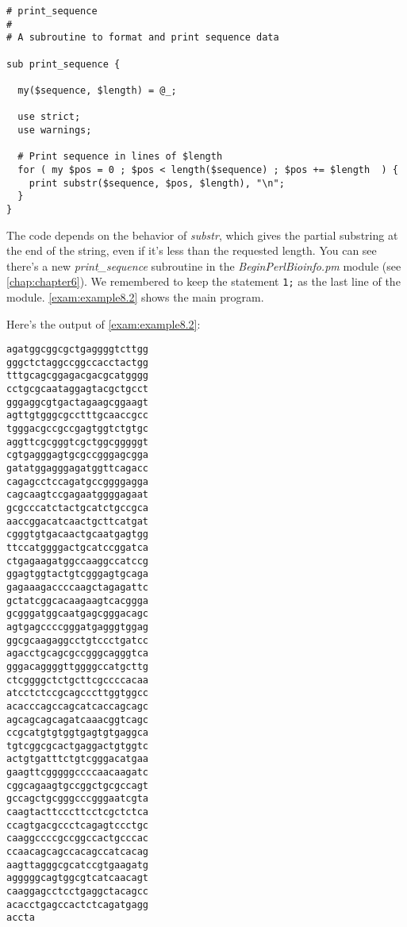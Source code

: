 \begin{lstlisting}
# print_sequence
#
# A subroutine to format and print sequence data 

sub print_sequence {
  
  my($sequence, $length) = @_;

  use strict;
  use warnings;

  # Print sequence in lines of $length
  for ( my $pos = 0 ; $pos < length($sequence) ; $pos += $length  ) {
    print substr($sequence, $pos, $length), "\n";
  }
}
\end{lstlisting}

The code depends on the behavior of \textit{substr}, which gives the partial substring at the end of the string, even if it's less than the requested length. You can see there's a new \textit{print\_sequence} subroutine in the \textit{BeginPerlBioinfo.pm} module (see \autoref{chap:chapter6}). We remembered to keep the statement \verb|1;| as the last line of the module. \autoref{exam:example8.2} shows the main program. 



Here's the output of \autoref{exam:example8.2}:

\begin{lstlisting}
agatggcggcgctgaggggtcttgg
gggctctaggccggccacctactgg
tttgcagcggagacgacgcatgggg
cctgcgcaataggagtacgctgcct
gggaggcgtgactagaagcggaagt
agttgtgggcgcctttgcaaccgcc
tgggacgccgccgagtggtctgtgc
aggttcgcgggtcgctggcgggggt
cgtgagggagtgcgccgggagcgga
gatatggagggagatggttcagacc
cagagcctccagatgccggggagga
cagcaagtccgagaatggggagaat
gcgcccatctactgcatctgccgca
aaccggacatcaactgcttcatgat
cgggtgtgacaactgcaatgagtgg
ttccatggggactgcatccggatca
ctgagaagatggccaaggccatccg
ggagtggtactgtcgggagtgcaga
gagaaagaccccaagctagagattc
gctatcggcacaagaagtcacggga
gcgggatggcaatgagcgggacagc
agtgagccccgggatgagggtggag
ggcgcaagaggcctgtccctgatcc
agacctgcagcgccgggcagggtca
gggacaggggttggggccatgcttg
ctcggggctctgcttcgccccacaa
atcctctccgcagcccttggtggcc
acacccagccagcatcaccagcagc
agcagcagcagatcaaacggtcagc
ccgcatgtgtggtgagtgtgaggca
tgtcggcgcactgaggactgtggtc
actgtgatttctgtcgggacatgaa
gaagttcgggggccccaacaagatc
cggcagaagtgccggctgcgccagt
gccagctgcgggcccgggaatcgta
caagtacttcccttcctcgctctca
ccagtgacgccctcagagtccctgc
caaggccccgccggccactgcccac
ccaacagcagccacagccatcacag
aagttagggcgcatccgtgaagatg
agggggcagtggcgtcatcaacagt
caaggagcctcctgaggctacagcc
acacctgagccactctcagatgagg
accta
\end{lstlisting}

